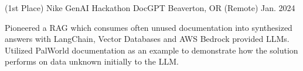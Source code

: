 


\begin{cventries}


\cventry
{(1st Place) Nike GenAI Hackathon} %
{DocGPT} %
{Beaverton, OR (Remote)} %
{Jan. 2024} %
{ %
\begin{cvitems}
\item {Pioneered a RAG which consumes often unused documentation into synthesized answers with LangChain, Vector Databases and AWS Bedrock provided LLMs. Utilized PalWorld documentation as an example to demonstrate how the solution performs on data unknown initially to the LLM.}
\end{cvitems}
}




\end{cventries}
